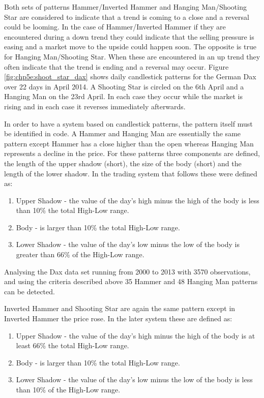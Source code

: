 Both sets of patterns Hammer/Inverted Hammer and Hanging Man/Shooting Star are considered to indicate that a trend is coming to a close and a reversal could be looming. In the case of Hammer/Inverted Hammer if they are encountered during a down trend they could indicate that the selling pressure is easing and a market move to the upside could happen soon. The opposite is true for Hanging Man/Shooting Star. When these are encountered in an up trend they often indicate that the trend is ending and a reversal may occur. Figure \ref{fig:chp5e:shoot_star_dax} shows daily candlestick patterns for the German Dax over 22 days in April 2014. A Shooting Star is circled on the 6th April and a Hanging Man on the 23rd April. In each case they occur while the market is rising and in each case it reverses immediately afterwards.

In order to have a system based on candlestick patterns, the pattern itself must be identified in code. A Hammer and Hanging Man are essentially the same pattern except Hammer has a close higher than the open whereas Hanging Man represents a decline in the price. For these patterns three components are defined, the length of the upper shadow (short), the size of the body (short) and the length of the lower shadow. In the trading system that follows these were defined as:

\begin{enumerate}
\item Upper Shadow - the value of the day's high minus the high of the body is less than 10\% the total High-Low range.
\item Body - is larger than 10\% the total High-Low range.
\item Lower Shadow - the value of the day's low minus the low of the body is greater than 66\% of the High-Low range.
\end{enumerate}

Analysing the Dax data set running from 2000 to 2013 with 3570 observations, and using the criteria described above 35 Hammer and 48 Hanging Man patterns can be detected. 

Inverted Hammer and Shooting Star are again the same pattern except in Inverted Hammer the price rose. In the later system these are defined as:

\begin{enumerate}
\item Upper Shadow - the value of the day's high minus the high of the body is at least 66\% the total High-Low range.
\item Body - is larger than 10\% the total High-Low range.
\item Lower Shadow - the value of the day's low minus the low of the body is less than 10\% of the High-Low range.
\end{enumerate}

